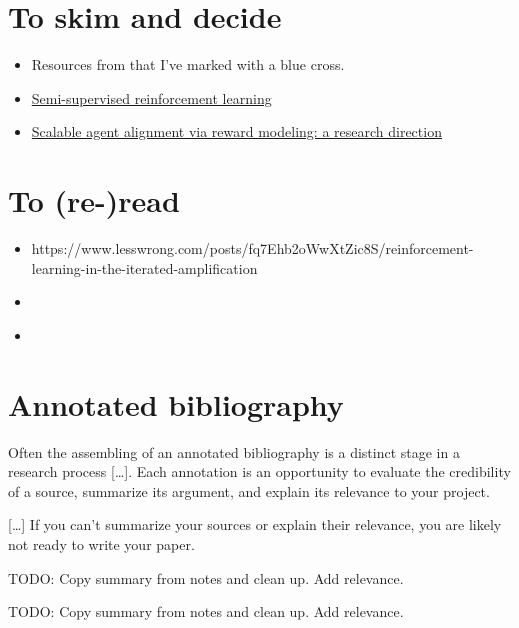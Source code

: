\documentclass{farlamp}
\begin{document}
\section{To skim and decide}

\begin{itemize}
\item Resources from \textcite{CSASupAmp} that I've marked with a blue cross.
\item
    \href{https://ai-alignment.com/semi-supervised-reinforcement-learning-cf7d5375197f}{Semi-supervised reinforcement learning}
\item \href{https://arxiv.org/abs/1811.07871}{Scalable agent alignment via
    reward modeling: a research direction}
\end{itemize}


\section{To (re-)read}

\begin{itemize}
    \item https://www.lesswrong.com/posts/fq7Ehb2oWwXtZic8S/reinforcement-learning-in-the-iterated-amplification
    \item \cite{ChriREngP}
    \item \cite{ChriThoRewE}
\end{itemize}


\section{Annotated bibliography}

\begin{displayquote}
    Often the assembling of an annotated bibliography is a distinct stage in a
    research process […]. Each annotation is an opportunity to evaluate the
    credibility of a source, summarize its argument, and explain its relevance
    to your project.

    […] If you can't summarize your sources or explain their relevance, you are
likely not ready to write your paper.
\end{displayquote}

TODO: Copy summary from notes and clean up. Add relevance.

TODO: Copy summary from notes and clean up. Add relevance.


\begin{FlushLeft}
    \printbibliography[notcategory=annotated]
\end{FlushLeft}
\end{document}
